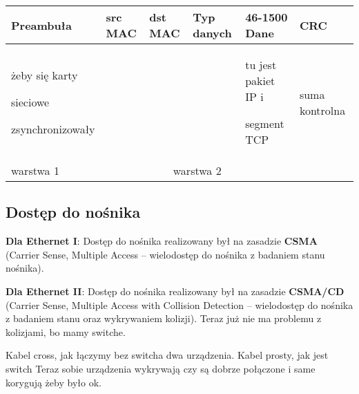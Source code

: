 \documentclass[../main.tex]{subfiles}
\begin{document}
    \begin{table}[H]
        \begin{center}
            \begin{tabular}{ | p{} | p{} | p{} | p{} | p{} | p{} | }
                \hline
                Preambuła & src MAC & dst MAC & Typ danych & 46-1500 Dane & CRC\\
                \hline
                żeby się karty

                sieciowe

                zsynchronizowały & & & & tu jest pakiet IP i

                segment TCP & suma kontrolna\\
                \hline
                warstwa 1 & \multicolumn{4}{c}{warstwa 2 }&\\
                \hline
            \end{tabular}
        \end{center}
    \end{table}

    \subsection{Dostęp do nośnika}

    \textbf{Dla Ethernet I}: Dostęp do nośnika realizowany był na zasadzie \textbf{CSMA} (Carrier Sense, Multiple Access – wielodostęp do nośnika z badaniem stanu nośnika).

    \textbf{Dla Ethernet II}: Dostęp do nośnika realizowany był na zasadzie \textbf{CSMA/CD} (Carrier Sense, Multiple Access with Collision Detection – wielodostęp do nośnika z badaniem stanu oraz wykrywaniem kolizji).
    Teraz już nie ma problemu z kolizjami, bo mamy switche.

    Kabel cross, jak łączymy bez switcha dwa urządzenia.
    Kabel prosty, jak jest switch
    Teraz sobie urządzenia wykrywają czy są dobrze połączone i same korygują żeby było ok.
\end{document}
